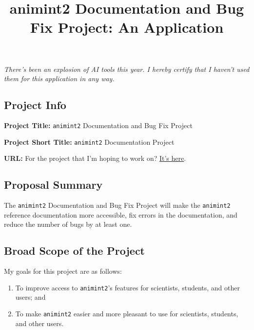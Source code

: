 \documentclass[
]{article}
\title{animint2 Documentation and Bug Fix Project: An Application}
\author{}
\date{}
\providecommand{\tightlist}{%
  \setlength{\itemsep}{0pt}\setlength{\parskip}{0pt}}\usepackage{longtable,booktabs,array}
\renewcommand*\contentsname{Table of contents}
\newcommand\contentsname{Table of contents}
\begin{document}
\maketitle
\ifdefined\Shaded\renewenvironment{Shaded}{\begin{tcolorbox}[frame hidden, boxrule=0pt, breakable, borderline west={3pt}{0pt}{shadecolor}, interior hidden, enhanced, sharp corners]}{\end{tcolorbox}}\fi

\renewcommand*\contentsname{Contents:}
{
\hypersetup{linkcolor=}
\setcounter{tocdepth}{3}
\tableofcontents
}
\emph{There's been an explosion of AI tools this year. I hereby certify
that I haven't used them for this application in any way.}

\hypertarget{project-info}{%
\subsection{Project Info}\label{project-info}}

\textbf{Project Title:} \texttt{animint2} Documentation and Bug Fix
Project

\textbf{Project Short Title:} \texttt{animint2} Documentation Project

\textbf{URL:} For the project that I'm hoping to work on?
\href{https://github.com/rstats-gsoc/gsoc2023/wiki/Animated-interactive-ggplots}{It's
here}.

\hypertarget{proposal-summary}{%
\subsection{Proposal Summary}\label{proposal-summary}}

The \texttt{animint2} Documentation and Bug Fix Project will make the
\texttt{animint2} reference documentation more accessible, fix errors in
the documentation, and reduce the number of bugs by at least one.

\hypertarget{broad-scope-of-the-project}{%
\subsection{Broad Scope of the
Project}\label{broad-scope-of-the-project}}

My goals for this project are as follows:

\begin{enumerate}
\def\labelenumi{\arabic{enumi}.}
\tightlist
\item
  To improve access to \texttt{animint2}'s features for scientists,
  students, and other users; and
\item
  To make \texttt{animint2} easier and more pleasant to use for
  scientists, students, and other users.
\end{enumerate}
\end{document}
